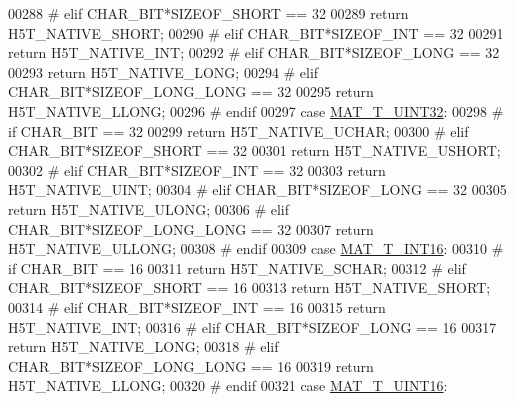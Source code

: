 \begin{DoxyCode}
00288 \textcolor{preprocessor}{#       elif CHAR\_BIT*SIZEOF\_SHORT == 32}
00289             \textcolor{keywordflow}{return} H5T\_NATIVE\_SHORT;
00290 \textcolor{preprocessor}{#       elif CHAR\_BIT*SIZEOF\_INT == 32}
00291             \textcolor{keywordflow}{return} H5T\_NATIVE\_INT;
00292 \textcolor{preprocessor}{#       elif CHAR\_BIT*SIZEOF\_LONG == 32}
00293             \textcolor{keywordflow}{return} H5T\_NATIVE\_LONG;
00294 \textcolor{preprocessor}{#       elif CHAR\_BIT*SIZEOF\_LONG\_LONG == 32}
00295             \textcolor{keywordflow}{return} H5T\_NATIVE\_LLONG;
00296 \textcolor{preprocessor}{#       endif}
00297         \textcolor{keywordflow}{case} \hyperlink{group___m_a_t_ggacf7b3b879282b7ab3a51190e49bf3453aa397e285a23fe240368b752897652c6a}{MAT\_T\_UINT32}:
00298 \textcolor{preprocessor}{#       if CHAR\_BIT == 32}
00299             \textcolor{keywordflow}{return} H5T\_NATIVE\_UCHAR;
00300 \textcolor{preprocessor}{#       elif CHAR\_BIT*SIZEOF\_SHORT == 32}
00301             \textcolor{keywordflow}{return} H5T\_NATIVE\_USHORT;
00302 \textcolor{preprocessor}{#       elif CHAR\_BIT*SIZEOF\_INT == 32}
00303             \textcolor{keywordflow}{return} H5T\_NATIVE\_UINT;
00304 \textcolor{preprocessor}{#       elif CHAR\_BIT*SIZEOF\_LONG == 32}
00305             \textcolor{keywordflow}{return} H5T\_NATIVE\_ULONG;
00306 \textcolor{preprocessor}{#       elif CHAR\_BIT*SIZEOF\_LONG\_LONG == 32}
00307             \textcolor{keywordflow}{return} H5T\_NATIVE\_ULLONG;
00308 \textcolor{preprocessor}{#       endif}
00309         \textcolor{keywordflow}{case} \hyperlink{group___m_a_t_ggacf7b3b879282b7ab3a51190e49bf3453a8c5b2e381946e95ea8d81ac216743302}{MAT\_T\_INT16}:
00310 \textcolor{preprocessor}{#       if CHAR\_BIT == 16}
00311             \textcolor{keywordflow}{return} H5T\_NATIVE\_SCHAR;
00312 \textcolor{preprocessor}{#       elif CHAR\_BIT*SIZEOF\_SHORT == 16}
00313             \textcolor{keywordflow}{return} H5T\_NATIVE\_SHORT;
00314 \textcolor{preprocessor}{#       elif CHAR\_BIT*SIZEOF\_INT == 16}
00315             \textcolor{keywordflow}{return} H5T\_NATIVE\_INT;
00316 \textcolor{preprocessor}{#       elif CHAR\_BIT*SIZEOF\_LONG == 16}
00317             \textcolor{keywordflow}{return} H5T\_NATIVE\_LONG;
00318 \textcolor{preprocessor}{#       elif CHAR\_BIT*SIZEOF\_LONG\_LONG == 16}
00319             \textcolor{keywordflow}{return} H5T\_NATIVE\_LLONG;
00320 \textcolor{preprocessor}{#       endif}
00321         \textcolor{keywordflow}{case} \hyperlink{group___m_a_t_ggacf7b3b879282b7ab3a51190e49bf3453a05bc7af7680aa68be95126ae0a4c2e31}{MAT\_T\_UINT16}:

\end{DoxyCode}
